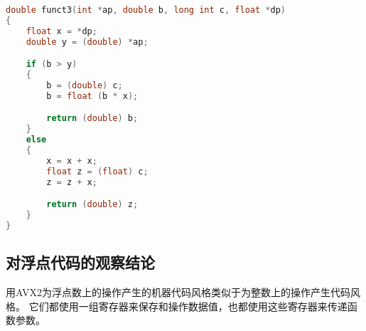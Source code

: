 {{        %
        \begin{practicec}
            \begin{lstlisting}[language=C]
double funct3(int *ap, double b, long int c, float *dp)
{
    float x = *dp;
    double y = (double) *ap;

    if (b > y)
    {
        b = (double) c;
        b = float (b * x);

        return (double) b;
    }
    else
    {
        x = x + x;
        float z = (float) c;
        z = z + x;

        return (double) z;
    }
}
            \end{lstlisting}
        \end{practicec}
    }

    \subsection{对浮点代码的观察结论}
    {
        用AVX2为浮点数上的操作产生的机器代码风格类似于为整数上的操作产生代码风格。
        它们都使用一组寄存器来保存和操作数据值，也都使用这些寄存器来传递函数参数。
    }
}
